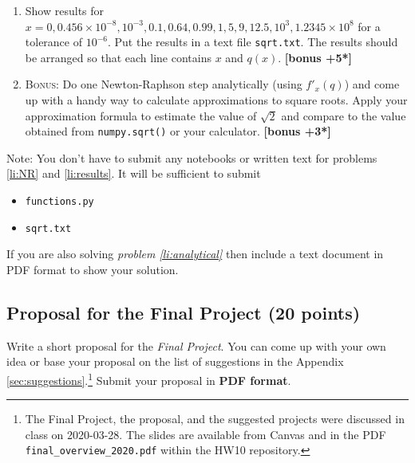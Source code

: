 \documentclass[letterpaper]{scrartcl}
\newcommand{\anumber}{10}
\newcounter{TotalBonus}
\newcommand{\BONUS}{\textsc{Bonus: }}
\newcommand{\bonus}[1]{\textbf{[bonus +#1*]}\stepcounter{TotalBonus}}
\newenvironment{enuma}{\begin{enumerate}[label=(\alph*)]}{\end{enumerate}}
\begin{document}
\begin{enuma}
  Your code must produce correct results, as tested with
  \texttt{test\_functions.py}.\footnote{Some specific tests are
    allowed to fail and they are marked with \texttt{x} or
    \texttt{xfail} in the test output --- this is ok.} You can run
  these tests yourself with
\begin{verbatim}
pytest -v test_functions.py
\end{verbatim}
  (in the same directory as your \texttt{functions.py}). \bonus{10}
\item \label{li:results} Show results for
  $x = 0, 0.456\times 10^{-8}, 10^{-3}, 0.1, 0.64, 0.99, 1, 5, 9, 12.5,
  10^{3}, 1.2345 \times 10^{8}$
  for a tolerance of $10^{-6}$. Put the results in a text file
  \texttt{sqrt.txt}. The results should be arranged so that each line
  contains $x$ and $q(x)$. \bonus{5}
\item \label{li:analytical}\BONUS Do one Newton-Raphson step
  analytically (using $f'_{x}(q)$) and come up with a handy way to
  calculate approximations to square roots. Apply your approximation
  formula to estimate the value of $\sqrt{2}$ and compare to the value
  obtained from \texttt{numpy.sqrt()} or your calculator. \bonus{3}
\end{enuma}

\noindent
Note: You don't have to submit any notebooks or written
text for problems \ref{li:NR} and \ref{li:results}. It will be sufficient to submit
\begin{itemize}
\item \texttt{functions.py}
\item \texttt{sqrt.txt}
\end{itemize}
If you are also solving \emph{problem \ref{li:analytical}}
then include a text document in PDF format to show your solution.





\subsection{Proposal for the Final Project (20 points)}
\label{sec:proposal}

Write a short proposal for the \emph{Final Project}. You can come up
with your own idea or base your proposal on the list of suggestions in
the Appendix \ref{sec:suggestions}.\footnote{The Final Project, the
  proposal, and the suggested projects were discussed in class on
  2020-03-28. The slides are available from Canvas and in the PDF
  \texttt{final\_overview\_2020.pdf} within the HW\anumber{}
  repository.} Submit your proposal in \textbf{PDF format}.
\end{document}
